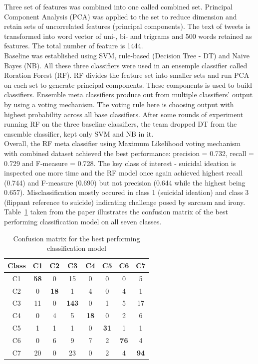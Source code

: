 Three set of features was combined into one called combined set. Principal Component Analysis (PCA) was applied to the set to reduce dimension and retain sets of uncorrelated features (principal components). The text of tweets is transformed into word vector of uni-, bi- and trigrams and 500 words retained as features. The total number of feature is 1444.\\
Baseline was established using SVM, rule-based (Decision Tree - DT) and Naive Bayes (NB). All these three classifiers were used in an ensemple classifier called Roration Forest (RF). RF divides the feature set into smaller sets and run PCA on each set to generate principal components. These components is used to build classifiers. Ensemble meta classifiers produce out from multiple classifiers' output by using a voting mechanism. The voting rule here is choosing output with highest probability across all base classifiers. After some rounds of experiment running RF on the three baseline classifiers, the team dropped DT from the ensemble classifier, kept only SVM and NB in it.\\
Overall, the RF meta classifier using Maximum Likelihood voting mechanism with combined dataset achieved the best performance: precision = 0.732, recall = 0.729 and F-measure = 0.728. The key class of interest - suicidal ideation is inspected one more time and the RF model once again achieved highest recall (0.744) and F-measure (0.690) but not precision (0.644 while the highest being 0.657). Misclassification mostly occured in class 1 (suicidal ideation) and class 3 (flippant reference to suicide) indicating challenge posed by sarcasm and irony. Table~\ref{tab:confusion_matrix} taken from the paper illustrates the confusion matrix of the best performing classification model on all seven classes.  

\begin{table}
\center
\small
\noindent\begin{tabularx}{0.5\textwidth}{cccccccc}

\toprule
Class & C1 & C2 & C3 & C4 & C5 & C6 & C7  \\ 
\midrule
C1  & \textbf{58} & 0 & 15 & 0 & 0 & 0 & 5\\
C2 & 0 &  \textbf{18} &  1 &  4 &  0 &  4 &  1 \\
C3 & 11 &  0 &  \textbf{143} &  0 &  1 &  5 &  17  \\
C4 & 0  &  4 &  5 &  \textbf{18} &  0 &  2 &  6\\
C5 & 1 &  1 &  1 &  0 &  \textbf{31} &  1 &  1\\
C6 & 0 &  6 &  9 &  7 &  2 &  \textbf{76} &  4 \\
C7 & 20 &  0 &  23 &  0 &  2 &  4 &  \textbf{94}\\
\bottomrule
\end{tabularx}
\caption{Confusion matrix for the best performing classification model \cite{Burnap2015}}
\label{tab:confusion_matrix}
\end{table}

